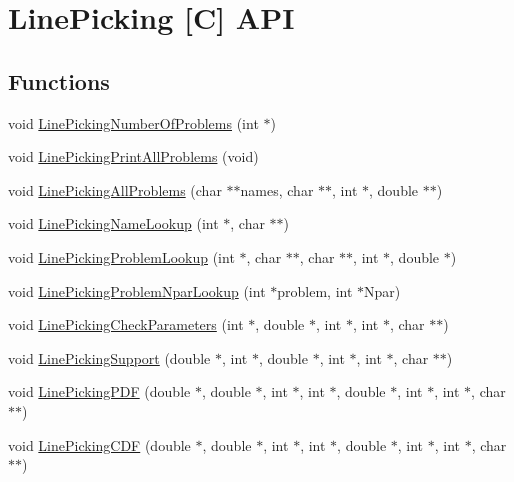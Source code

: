 \hypertarget{group__api}{\section{Line\-Picking \mbox{[}C\mbox{]} A\-P\-I}
\label{group__api}
}
\subsection*{Functions}
\begin{DoxyCompactItemize}
\item 
void \hyperlink{group__api_gab0e3cb9eaef2a9f040f1135eee394f28}{Line\-Picking\-Number\-Of\-Problems} (int $\ast$)
\item 
void \hyperlink{group__api_ga1a1c27d3c46da382a0443f810628a8ac}{Line\-Picking\-Print\-All\-Problems} (void)
\item 
void \hyperlink{group__api_gadb58de53bac5d2fe684019ce77be9896}{Line\-Picking\-All\-Problems} (char $\ast$$\ast$names, char $\ast$$\ast$, int $\ast$, double $\ast$$\ast$)
\item 
void \hyperlink{group__api_ga17699721a1826bc3c2a2c3d80dff6f64}{Line\-Picking\-Name\-Lookup} (int $\ast$, char $\ast$$\ast$)
\item 
void \hyperlink{group__api_gaab56d0ac9177e8ec90b87d0927220283}{Line\-Picking\-Problem\-Lookup} (int $\ast$, char $\ast$$\ast$, char $\ast$$\ast$, int $\ast$, double $\ast$)
\item 
void \hyperlink{group__api_ga5ac22934d32edfdf42075bff533e5ccb}{Line\-Picking\-Problem\-Npar\-Lookup} (int $\ast$problem, int $\ast$Npar)
\item 
void \hyperlink{group__api_gac55d1d166b33c8906ceccbb37010ddb0}{Line\-Picking\-Check\-Parameters} (int $\ast$, double $\ast$, int $\ast$, int $\ast$, char $\ast$$\ast$)
\item 
void \hyperlink{group__api_ga0aec0b2f87903f4bf4ad3011a99b3446}{Line\-Picking\-Support} (double $\ast$, int $\ast$, double $\ast$, int $\ast$, int $\ast$, char $\ast$$\ast$)
\item 
void \hyperlink{group__api_ga8feba9835984bd74f3d919f51389e573}{Line\-Picking\-P\-D\-F} (double $\ast$, double $\ast$, int $\ast$, int $\ast$, double $\ast$, int $\ast$, int $\ast$, char $\ast$$\ast$)
\item 
void \hyperlink{group__api_ga445ba2c007d60d789747cecbd5f874b9}{Line\-Picking\-C\-D\-F} (double $\ast$, double $\ast$, int $\ast$, int $\ast$, double $\ast$, int $\ast$, int $\ast$, char $\ast$$\ast$)

\end{DoxyCompactItemize}
